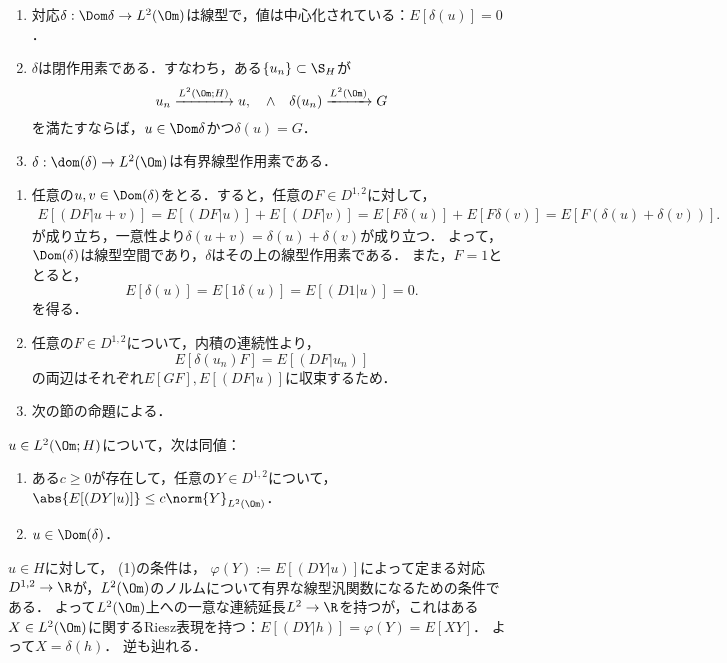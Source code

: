 \documentclass[uplatex,dvipdfmx]{jsreport}
\begin{document}
\begin{lemma}\mbox{}
    \begin{enumerate}
        \item 対応$\delta:\Dom\delta\to L^2(\Om)$は線型で，値は中心化されている：$E[\delta(u)]=0$．
        \item $\delta$は閉作用素である．すなわち，ある$\{u_n\}\subset\S_H$が
        \[u_n\xrightarrow{L^2(\Om;H)}u,\quad\land\quad \delta(u_n)\xrightarrow{L^2(\Om)}G\]
        を満たすならば，$u\in\Dom\delta$かつ$\delta(u)=G$．
        \item $\delta:\dom(\delta)\to L^2(\Om)$は有界線型作用素である．
    \end{enumerate}
\end{lemma}
\begin{Proof}\mbox{}
    \begin{enumerate}
        \item 任意の$u,v\in\Dom(\delta)$をとる．すると，任意の$F\in D^{1,2}$に対して，
        \begin{align*}
            E[(DF|u+v)]=E[(DF|u)]+E[(DF|v)]=E[F\delta(u)]+E[F\delta(v)]=E[F(\delta(u)+\delta(v))].
        \end{align*}
        が成り立ち，一意性より$\delta(u+v)=\delta(u)+\delta(v)$が成り立つ．
        よって，$\Dom(\delta)$は線型空間であり，$\delta$はその上の線型作用素である．
        また，$F=1$ととると，
        \[E[\delta(u)]=E[1\delta(u)]=E[(D1|u)]=0.\]
        を得る．
        \item 任意の$F\in D^{1,2}$について，内積の連続性より，
        \[E[\delta(u_n)F]=E[(DF|u_n)]\]
        の両辺はそれぞれ$E[GF],E[(DF|u)]$に収束するため．
        \item 次の節の命題による．
    \end{enumerate}
\end{Proof}

\begin{lemma}[発散の定義域の特徴付け]
    $u\in L^2(\Om;H)$について，次は同値：
    \begin{enumerate}
        \item ある$c\ge0$が存在して，任意の$Y\in D^{1,2}$について，$\abs{E[(DY|u)]}\le c\norm{Y}_{L^2(\Om)}$．
        \item $u\in \Dom(\delta)$．
    \end{enumerate}
\end{lemma}
\begin{Proof}
    $u\in H$に対して，
    (1)の条件は，
    $\varphi(Y):=E[(DY|u)]$によって定まる対応$D^{1,2}\to\R$が，$L^2(\Om)$のノルムについて有界な線型汎関数になるための条件である．
    よって$L^2(\Om)$上への一意な連続延長$L^2\to\R$を持つが，これはある$X\in L^2(\Om)$に関するRiesz表現を持つ：$E[(DY|h)]=\varphi(Y)=E[XY]$．
    よって$X=\delta(h)$．
    逆も辿れる．
\end{Proof}
\end{document}
